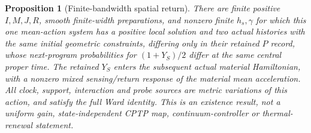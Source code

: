 \documentclass[12pt,a4paper]{article}
\newtheorem{proposition}[theorem]{Proposition}
\begin{document}
\begin{proposition}[Finite-bandwidth spatial return]
\label{prop:finite-spatial-return}
There are finite positive $I,M,J,R$, smooth finite-width preparations,
and nonzero finite $h_s,\gamma$ for which this one mean-action system has
a positive local solution and two actual histories with the same initial
geometric constraints, differing only in their retained $P$ record,
whose next-program probabilities for $(1+Y_S)/2$ differ at the same
central proper time. The retained $Y_S$ enters the subsequent actual
material Hamiltonian, with a nonzero mixed sensing/return response of
the material mean acceleration. All clock, support, interaction
and probe sources are metric variations of this action, and satisfy the
full Ward identity. This is an existence result, not a uniform gain,
state-independent CPTP map, continuum-controller or thermal-renewal
statement.
\end{proposition}
\end{document}
